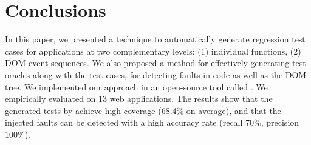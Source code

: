 \section{Conclusions} \label{Sec:concs}

In this paper, we presented a technique  to automatically generate regression test cases for \javascript applications at two complementary levels: (1) individual \javascript functions, (2) DOM event sequences. We also proposed a method for effectively generating test oracles along with the test cases, for detecting faults in \javascript code as well as the DOM tree. We implemented our  approach in an open-source tool called \tool. We empirically evaluated \tool on 13 web applications. The results show that the generated tests by \tool achieve high coverage (68.4\% on average),  and that the injected faults can be detected with a high accuracy rate (recall 70\%, precision 100\%). 
%
 